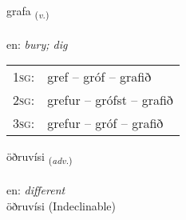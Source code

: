 \documentclass[frontgrid, backgrid]{flacards}\usepackage[]{graphicx}\usepackage[]{color}
\begin{document}
\renewcommand{\flhead}{\vskip5pt \fboxsep=0pt {\small\bfseries\footnotesize Sagnorð | Verb}}
\renewcommand{\fcfoot}{\vskip5pt \fboxsep=0pt \hspace{2pt}{\small\bfseries\footnotesize 2K}}

\renewcommand{\blhead}{\vskip5pt {\small\bfseries\footnotesize Sagnorð | Verb }}
\renewcommand{\bcfoot}{\vskip5pt \hspace{2pt}{\small\bfseries\footnotesize 2K}}


{grafa \small{\textsubscript{(\textit{v.})}} \\[1ex] %
\textphonetic{[kraːva]} \\
en: \emph{bury; dig} \\  [2ex]
\renewcommand*{\arraystretch}{0.8}
\begin{tabular}{p{1cm}l}
\textsc{1sg}: & gref -- gróf -- grafið \\ 
\textsc{2sg}: & grefur -- grófst -- grafið \\ 
\textsc{3sg}: & grefur -- gróf -- grafið \\ 
\end{tabular}
}


\renewcommand{\flhead}{\vskip5pt \fboxsep=0pt {\small\bfseries\footnotesize Atviksorð | Adverb}}
\renewcommand{\fcfoot}{\vskip5pt \fboxsep=0pt \hspace{2pt}{\small\bfseries\footnotesize 2K}}

\renewcommand{\blhead}{\vskip5pt {\small\bfseries\footnotesize Atviksorð | Adverb }}
\renewcommand{\bcfoot}{\vskip5pt \hspace{2pt}{\small\bfseries\footnotesize 2K}}


{öðruvísi \small{\textsubscript{(\textit{adv.})}} \\[1ex]
\textphonetic{[œðrʏvisɪ]} \\
en: \emph{different} \\  [2ex]
öðruvísi (Indeclinable)}

\renewcommand{\flhead}{\vskip5pt \fboxsep=0pt {\small\bfseries\footnotesize Sagnorð | Verb}}
\renewcommand{\fcfoot}{\vskip5pt \fboxsep=0pt \hspace{2pt}{\small\bfseries\footnotesize 2K}}
\end{document}
